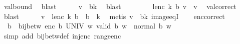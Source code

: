 \begin{isabellebody}
\ val{\isacharunderscore}{\kern0pt}bound\ \isamarkupfalse%
\ blast\isanewline
\ \ \ \ \isamarkupfalse%
\ {\isachardoublequoteopen}{\isacharquery}{\kern0pt}v\ {\isasymin}\ {\isacharbraceleft}{\kern0pt}{\isachardot}{\kern0pt}{\isachardot}{\kern0pt}{\isacharless}{\kern0pt}b{\isacharcircum}{\kern0pt}k{\isacharbraceright}{\kern0pt}{\isachardoublequoteclose}\ \isamarkupfalse%
\ blast\isanewline
\ \ \ \ \isamarkupfalse%
\ {\isachardoublequoteopen}{}{\isachardoublequoteclose}\ \isamarkupfalse%
\ {\isachardoublequoteopen}lenc\ k\ b\ {\isacharquery}{\kern0pt}v\ {\isacharequal}{\kern0pt}\ v{\isachardoublequoteclose}\ \isamarkupfalse%
\ val{\isacharunderscore}{\kern0pt}correct\ \isamarkupfalse%
\ blast\isanewline
\ \ \ \ \isamarkupfalse%
\ {\isachardoublequoteopen}v\ {\isasymin}\ lenc\ k\ b\ {\isacharbackquote}{\kern0pt}\ {\isacharbraceleft}{\kern0pt}{\isachardot}{\kern0pt}{\isachardot}{\kern0pt}{\isacharless}{\kern0pt}b\ {\isacharcircum}{\kern0pt}\ k{\isacharbraceright}{\kern0pt}{\isachardoublequoteclose}\ \isamarkupfalse%
\ {\isacharparenleft}{\kern0pt}metis\ {\isacartoucheopen}{\isacharquery}{\kern0pt}v\ {\isasymin}\ {\isacharbraceleft}{\kern0pt}{\isachardot}{\kern0pt}{\isachardot}{\kern0pt}{\isacharless}{\kern0pt}b{\isacharcircum}{\kern0pt}k{\isacharbraceright}{\kern0pt}{\isacartoucheclose}\ image{\isacharunderscore}{\kern0pt}eqI{\isacharparenright}{\kern0pt}\isanewline
\ \ \isamarkupfalse%
\isanewline
{}\isamarkupfalse%
%
\endisatagproof
{\isafoldproof}%
%
\isadelimproof
\isanewline
%
\endisadelimproof
\isanewline
{}\isamarkupfalse%
\ enc{\isacharunderscore}{\kern0pt}correct{\isacharcolon}{\kern0pt}\isanewline
\ \ {\isachardoublequoteopen}{}{\isasymle}b\ {\isasymLongrightarrow}\ bij{\isacharunderscore}{\kern0pt}betw\ {\isacharparenleft}{\kern0pt}enc\ b{\isacharparenright}{\kern0pt}\ UNIV\ {\isacharbraceleft}{\kern0pt}w{\isachardot}{\kern0pt}\ valid\ b\ w\ {\isasymand}\ normal\ b\ w{\isacharbraceright}{\kern0pt}{\isachardoublequoteclose}\isanewline
%
\isadelimproof
\ \ %
\endisadelimproof
%
\isatagproof
{}\isamarkupfalse%
\ {\isacharparenleft}{\kern0pt}simp\ add{\isacharcolon}{\kern0pt}\ bij{\isacharunderscore}{\kern0pt}betw{\isacharunderscore}{\kern0pt}def\ inj{\isacharunderscore}{\kern0pt}enc\ range{\isacharunderscore}{\kern0pt}enc{\isacharparenright}{\kern0pt}%
\endisatagproof
{\isafoldproof}%
%
\isadelimproof
%
\endisadelimproof
%

\end{isabellebody}
